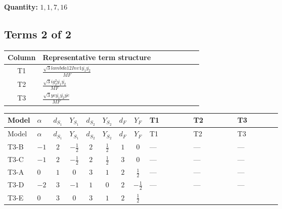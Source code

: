 \documentclass[8pt]{article}
\begin{document}
\begin{landscape}
\begin{longtable}{@{}llcccccc >{\raggedright\arraybackslash}p{0.21\linewidth} >{\raggedright\arraybackslash}p{0.21\linewidth} >{\raggedright\arraybackslash}p{0.21\linewidth}@{}}
\midrule
\bottomrule
\end{longtable}
\clearpage
\noindent\textbf{Quantity: }$\mathrm{1,1,7,16}$\par\smallskip
\subsection*{Terms 2 of 2}
\begin{center}
\begin{tabular}{@{}c >{\raggedright\arraybackslash}p{0.82\linewidth}@{}}
\toprule
Column & Representative term structure \\
\midrule
T1 & \(\displaystyle \frac{\sqrt{3} lambda12Inv1 \overline{y_{1}} \overline{y_{2}}}{MF}\) \\
\midrule
T2 & \(\displaystyle \frac{\sqrt{3} i g_{2}^{2} \overline{y_{1}} \overline{y_{2}}}{MF}\) \\
\midrule
T3 & \(\displaystyle \frac{\sqrt{3} ye \overline{y_{1}} \overline{y_{2}} \overline{ye}}{MF}\) \\
\midrule
\bottomrule
\end{tabular}
\end{center}
\smallskip
\tiny
\begin{longtable}{@{}llcccccc >{\raggedright\arraybackslash}p{0.21\linewidth} >{\raggedright\arraybackslash}p{0.21\linewidth} >{\raggedright\arraybackslash}p{0.21\linewidth}@{}}
\toprule
Model & $\alpha$ & $d_{S_1}$ & $Y_{S_1}$ & $d_{S_2}$ & $Y_{S_2}$ & $d_F$ & $Y_F$ & T1 & T2 & T3 \\
\midrule
\endfirsthead
\toprule
Model & $\alpha$ & $d_{S_1}$ & $Y_{S_1}$ & $d_{S_2}$ & $Y_{S_2}$ & $d_F$ & $Y_F$ & T1 & T2 & T3 \\
\midrule
\endhead
T3-B & $-1$ & $2$ & $-\frac{1}{2}$ & $2$ & $\frac{1}{2}$ & $1$ & $0$ & --- & --- & --- \\
\midrule
T3-C & $-1$ & $2$ & $-\frac{1}{2}$ & $2$ & $\frac{1}{2}$ & $3$ & $0$ & --- & --- & --- \\
\midrule
T3-A & $0$ & $1$ & $0$ & $3$ & $1$ & $2$ & $\frac{1}{2}$ & --- & --- & --- \\
\midrule
T3-D & $-2$ & $3$ & $-1$ & $1$ & $0$ & $2$ & $-\frac{1}{2}$ & --- & --- & --- \\
\midrule
T3-E & $0$ & $3$ & $0$ & $3$ & $1$ & $2$ & $\frac{1}{2}$ & \scriptsize\adjustbox{max width=\linewidth}{$\begin{gathered} \frac{\sqrt{3} lambda12Inv1 \overline{y_{1}} \overline{y_{2}}}{6 MF}\end{gathered}$} & \scriptsize\adjustbox{max width=\linewidth}{$\begin{gathered} \frac{\sqrt{3} i g_{2}^{2} \overline{y_{1}} \overline{y_{2}}}{6 MF}\end{gathered}$} & \scriptsize\adjustbox{max width=\linewidth}{$\begin{gathered} \frac{\sqrt{3} ye \overline{y_{1}} \overline{y_{2}} \overline{ye}}{12 MF}\end{gathered}$} \\
\midrule
\bottomrule
\end{longtable}
\clearpage

\end{landscape}
\end{document}
